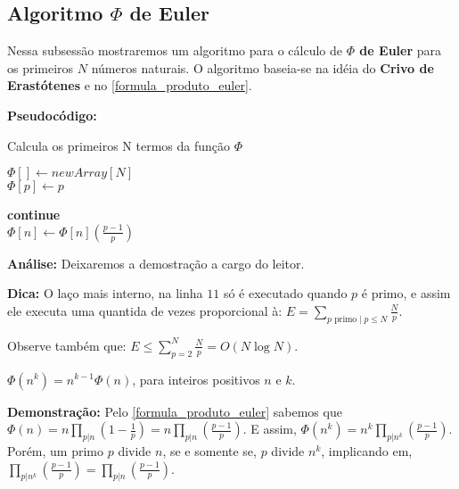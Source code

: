 \subsection{Algoritmo $\Phi$ de Euler}

Nessa subsessão mostraremos um algoritmo para o cálculo de \textbf{$\Phi$ de Euler} para os primeiros $N$ números naturais.
O algoritmo baseia-se na idéia do \textbf{Crivo de Erastótenes} e no \autoref{formula_produto_euler}.
\newline

\textbf{Pseudocódigo:}
\begin{algorithm}
\caption{Calcula os primeiros N termos da função $\Phi$}
\begin{algorithmic}[1]
\State $\Phi[] \gets new Array[N]$
\\
\State $\Phi[p] \gets p$
\EndFor
\\

 
\State \textbf{continue}
\EndIf
\\
\State $\Phi[n] \gets \Phi[n] (\frac{p-1}{p})$
\EndFor
\EndFor
\\
\State \Return {$\Phi[]$}
\EndProcedure
\end{algorithmic}
\end{algorithm}

\textbf{Análise:}
Deixaremos a demostração a cargo do leitor.

\textbf{Dica:}
O laço mais interno, na linha $11$ só é executado quando $p$ é primo, e assim ele executa uma quantida de vezes proporcional à:
$E = \sum_{p\text{ primo} \mid p \leq N}\frac{N}{p} $.

Observe também que: $E \leq \sum_{p=2}^{N}\frac{N}{p} = O(N\log N)$. 


\begin{proposition}\label{phi_potencia_nk}
$\Phi(n^k) = n^{k-1}\Phi(n)$, para inteiros positivos $n$ e $k$. 
\end{proposition}
\textbf{Demonstração:}
Pelo \autoref{formula_produto_euler} sabemos que $\Phi(n) = n \prod_{p|n}(1 - \frac{1}{p}) = n \prod_{p|n}(\frac{p-1}{p})$.
E assim, $\Phi(n^k) = n^k \prod_{p|n^k}(\frac{p-1}{p})$. Porém, um primo $p$ divide $n$, se e somente se, $p$ divide $n^k$, implicando em, 
$\prod_{p|n^k}(\frac{p-1}{p}) = \prod_{p|n}(\frac{p-1}{p})$.

